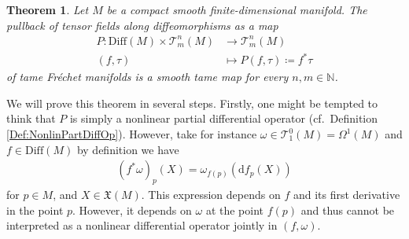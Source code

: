 \documentclass[12pt,a4paper]{article}
\theoremstyle{plain}
\newtheorem{theorem}{Theorem}[subsection]
\theoremstyle{definition}
\newcommand{\N}{\mathbb{N}}
\newcommand{\om}{\omega}
\newcommand{\VFs}{\mathfrak{X}(M)}
\newcommand{\Forms}[1]{\Omega^{#1}(M)}
\newcommand{\Diff}{\mathrm{Diff}(M)}
\newcommand{\tensf}[2]{\mathcal{T}^{#1}_{#2}(M)}
\renewcommand{\d}{\mathrm{d}}
\begin{document}
\begin{theorem}
\label{PullbackSmoothTame}
Let $M$ be a compact smooth finite-dimensional manifold.
The pullback of tensor fields along diffeomorphisms as a map
\begin{align*}
    P:\mathrm{Diff}(M)\times \tensf{n}{m}&\longrightarrow \tensf{n}{m}\\
    (f,\tau)&\longmapsto P(f,\tau)\coloneqq f^*\tau
\end{align*}
of tame Fréchet manifolds is a smooth tame map for every $n,m\in \N$. 
\end{theorem}

We will prove this theorem in several steps. Firstly, one might be tempted to think that $P$ is simply a nonlinear partial differential operator (cf.~Definition \ref{Def:NonlinPartDiffOp}). However, take for instance $\om\in \tensf{0}{1}=\Forms{1}$ and $f\in \Diff$ by definition we have
\begin{align*}
    (f^*\om)_p(X)=\om_{f(p)}(\d f_p(X))
\end{align*}
for $p\in M$, and $X\in \VFs$.
This expression depends on $f$ and its first derivative in the point $p$. However, it depends on $\om$ at the point $f(p)$ and thus cannot be interpreted as a nonlinear differential operator jointly in $(f,\om)$.
\end{document}
